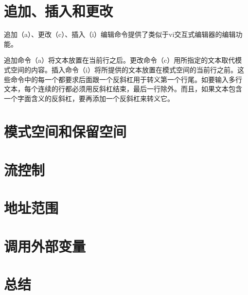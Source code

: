 \section{追加、插入和更改}
\label{sec:appendInsertChange}

追加（a）、更改（c）、插入（i）编辑命令提供了类似于vi交互式编辑器的编辑功能。

追加命令（a）将文本放置在当前行之后。更改命令（c）用所指定的文本取代模
式空间的内容。插入命令（i）将所提供的文本放置在模式空间的当前行之前。这
些命令中的每一个都要求后面跟一个反斜杠用于转义第一个行尾。如要输入多行
文本，每个连续的行都必须用反斜杠结束，最后一行除外。而且，如果文本包含
一个字面含义的反斜杠，要再添加一个反斜杠来转义它。

\section{模式空间和保留空间}
\label{sec:patternSpace}

\section{流控制}
\label{sec:flowControl}

\section{地址范围}
\label{sec:addrSpace}

\section{调用外部变量}
\label{sec:callExternalVariable}

\section{总结}
\label{sec:summary}

